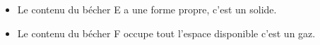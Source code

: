 \begin{questions}
\begin{solution}
\begin{itemize}
				\item Le contenu du bécher E a une forme propre, c'est un solide.
				
				\item Le contenu du bécher F occupe tout l'espace disponible c'est un gaz.
			\end{itemize}
		\end{solution}

\end{questions}